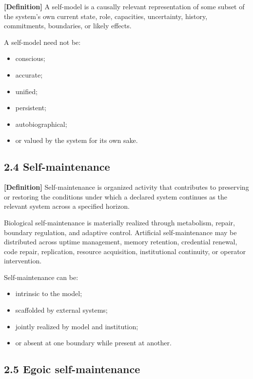 \documentclass[
  11pt,
]{article}
\providecommand{\tightlist}{%
  \setlength{\itemsep}{0pt}\setlength{\parskip}{0pt}}
\begin{document}
\textbf{{[}Definition{]}} A self-model is a causally relevant
representation of some subset of the system's own current state, role,
capacities, uncertainty, history, commitments, boundaries, or likely
effects.

A self-model need not be:

\begin{itemize}
\tightlist
\item
  conscious;
\item
  accurate;
\item
  unified;
\item
  persistent;
\item
  autobiographical;
\item
  or valued by the system for its own sake.
\end{itemize}

\subsection{2.4 Self-maintenance}\label{self-maintenance}

\textbf{{[}Definition{]}} Self-maintenance is organized activity that
contributes to preserving or restoring the conditions under which a
declared system continues as the relevant system across a specified
horizon.

Biological self-maintenance is materially realized through metabolism,
repair, boundary regulation, and adaptive control. Artificial
self-maintenance may be distributed across uptime management, memory
retention, credential renewal, code repair, replication, resource
acquisition, institutional continuity, or operator intervention.

Self-maintenance can be:

\begin{itemize}
\tightlist
\item
  intrinsic to the model;
\item
  scaffolded by external systems;
\item
  jointly realized by model and institution;
\item
  or absent at one boundary while present at another.
\end{itemize}

\subsection{2.5 Egoic self-maintenance}\label{egoic-self-maintenance}
\end{document}
